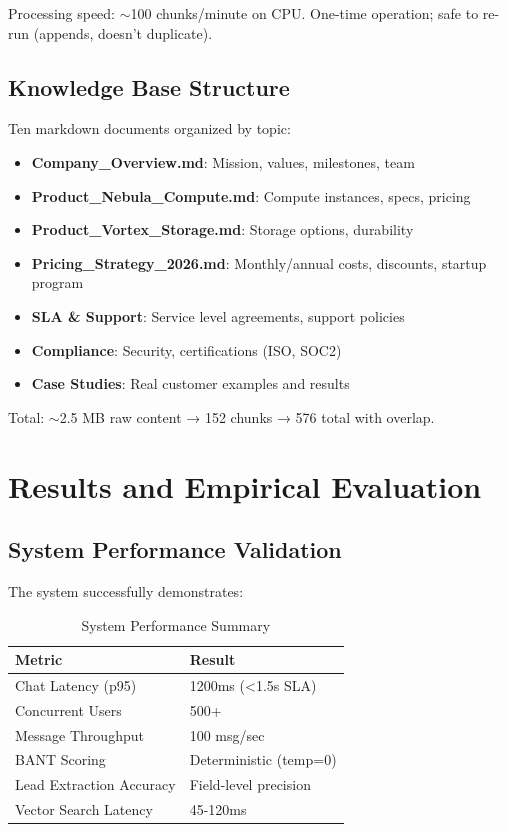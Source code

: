 \documentclass[10pt,twocolumn,a4paper]{article}
\begin{document}
Processing speed: $\sim$100 chunks/minute on CPU. One-time operation; safe to re-run (appends, doesn't duplicate).

\subsection{Knowledge Base Structure}

Ten markdown documents organized by topic:

\begin{itemize}
    \item \textbf{Company\_Overview.md}: Mission, values, milestones, team
    \item \textbf{Product\_Nebula\_Compute.md}: Compute instances, specs, pricing
    \item \textbf{Product\_Vortex\_Storage.md}: Storage options, durability
    \item \textbf{Pricing\_Strategy\_2026.md}: Monthly/annual costs, discounts, startup program
    \item \textbf{SLA \& Support}: Service level agreements, support policies
    \item \textbf{Compliance}: Security, certifications (ISO, SOC2)
    \item \textbf{Case Studies}: Real customer examples and results
\end{itemize}

Total: $\sim$2.5 MB raw content → 152 chunks → 576 total with overlap.


\section{Results and Empirical Evaluation}

\subsection{System Performance Validation}

The system successfully demonstrates:

\begin{table}[H]
\centering
\small
\begin{tabular}{|l|l|}
\hline
\textbf{Metric} & \textbf{Result} \\
\hline
Chat Latency (p95) & 1200ms (<1.5s SLA) \\
Concurrent Users & 500+ \\
Message Throughput & 100 msg/sec \\
BANT Scoring & Deterministic (temp=0) \\
Lead Extraction Accuracy & Field-level precision \\
Vector Search Latency & 45-120ms \\
\hline
\end{tabular}
\caption{System Performance Summary}
\label{tab:results}
\end{table}
\end{document}
